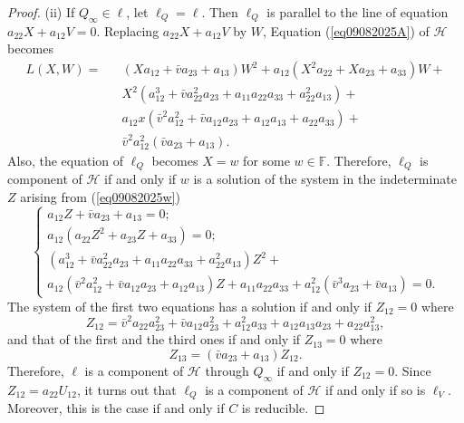 \documentclass[10pt,a4paper]{amsart}
\begin{document}
\begin{proof}
(ii) If $Q_\infty \in \ell$, let $\ell_Q=\ell$. Then $\ell_Q$ is parallel to the line  of equation $a_{22}X+a_{12}V=0$. Replacing $a_{22}X+a_{12}V$ by $W$, Equation (\ref{eq09082025A}) of $\mathcal{H}$ becomes
\begin{equation}
\label{eq09082025w}
\begin{array}{llll}L(X,W)=&&(Xa_{12}+\bar{v}a_{23}+a_{13})W^2+a_{12}(X^2a_{22}+Xa_{23}+a_{33})W+\\
&&X^2(a_{12}^3+\bar{v}a_{22}^2a_{23}+a_{11}a_{22}a_{33}+a_{22}^2a_{13})+\\
&&a_{12}x(\bar{v}^2a_{12}^2+\bar{v}a_{12}a_{23}+a_{12}a_{13}+a_{22}a_{33})+\\
&& \bar{v}^2a_{12}^2(\bar{v}a_{23}+a_{13}).
\end{array}
\end{equation}
Also, the equation of $\ell_Q$ becomes $X=w$ for some $w\in \mathbb{F}$.
Therefore, $\ell_Q$ is component of $\mathcal{H}$ if and only if $w$ is a solution of the system in the indeterminate $Z$ arising from (\ref{eq09082025w})
\begin{equation}
\label{eq09082025WW}
\begin{cases}
a_{12}Z+\bar{v}a_{23}+a_{13}=0;\\
a_{12}(a_{22}Z^2+a_{23}Z+a_{33})=0;\\
(a_{12}^3+\bar{v}a_{22}^2a_{23}+a_{11}a_{22}a_{33}+a_{22}^2a_{13})
Z^2+\\
a_{12}(\bar{v}^2a_{12}^2+\bar{v}a_{12}a_{23}+a_{12}a_{13})Z+a_{11}a_{22}a_{33}+
a_{12}^2(\bar{v}^3a_{23}+\bar{v}a_{13})=0.
\end{cases}
\end{equation}
The system of the first two equations has a solution if and only if
$Z_{12}=0$ where
\begin{equation}
\label{eq12082025B}
Z_{12}=\bar{v}^2a_{22}a_{23}^2+\bar{v}a_{12}a_{23}^2+a_{12}^2a_{33}+a_{12}a_{13}a_{23}+a_{22}a_{13}^2,
\end{equation}
and that of the first and the third ones if and only if $Z_{13}=0$ where
\begin{equation}
\label{eq12082025BB}
Z_{13}=(\bar{v}a_{23}+a_{13})Z_{12}.
\end{equation}
Therefore, $\ell$ is a component of $\mathcal{H}$ through $Q_\infty$ if and only if $Z_{12}=0$. Since $Z_{12}=a_{22}U_{12}$, it turns out that
$\ell_Q$ is a component of $\mathcal{H}$ if and only if so is $\ell_V$. Moreover, this is the case if and only if $C$ is reducible.


\end{proof}
\end{document}
